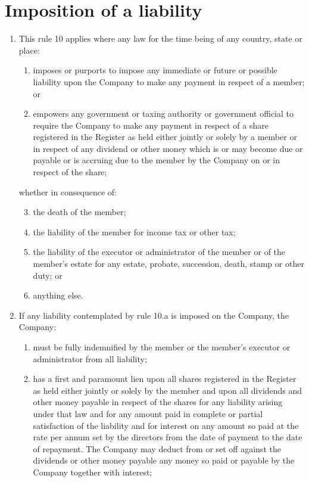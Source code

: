 \section{Imposition of a liability}

\begin{enumerate}[label=(\alph*)]
    \item This rule 10 applies where any law for the time being of any country, state or place:
    \begin{enumerate}[label=(\roman*)]
        \item imposes or purports to impose any immediate or future or possible liability upon the Company to make any payment in respect of a member; or
        \item empowers any government or taxing authority or government official to require the Company to make any payment in respect of a share registered in the Register as held either jointly or solely by a member or in respect of any dividend or other money which is or may become due or payable or is accruing due to the member by the Company on or in respect of the share;
    \end{enumerate}
    
    whether in consequence of:
    \begin{enumerate}[label=(\roman*)]
        \setcounter{enumii}{2}
        \item the death of the member;
        \item the liability of the member for income tax or other tax;
        \item the liability of the executor or administrator of the member or of the member's estate for any estate, probate, succession, death, stamp or other duty; or
        \item anything else.
    \end{enumerate}
    
    \item If any liability contemplated by rule 10.a is imposed on the Company, the Company:
    \begin{enumerate}[label=(\roman*)]
        \item must be fully indemnified by the member or the member's executor or administrator from all liability;
        
        \item has a first and paramount lien upon all shares registered in the Register as held either jointly or solely by the member and upon all dividends and other money payable in respect of the shares for any liability arising under that law and for any amount paid in complete or partial satisfaction of the liability and for interest on any amount so paid at the rate per annum set by the directors from the date of payment to the date of repayment. The Company may deduct from or set off against the dividends or other money payable any money so paid or payable by the Company together with interest;
        

\end{enumerate}
\end{enumerate}
